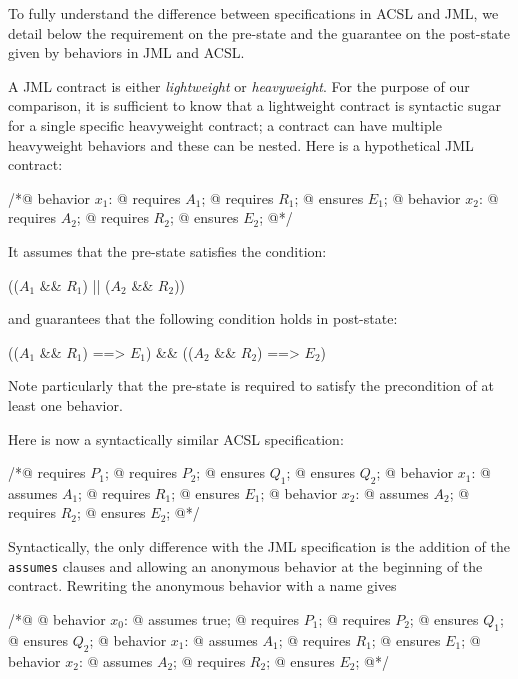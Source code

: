 To fully understand the difference between specifications in ACSL and
JML, we detail below the requirement on the pre-state and
the guarantee on the post-state given by behaviors in JML and ACSL.

A JML contract is either \emph{lightweight} or \emph{heavyweight}.
For the purpose of our comparison, it is sufficient to know that a
lightweight contract is syntactic sugar for a single specific 
heavyweight contract; a contract can have multiple heavyweight behaviors and these can be nested.
Here is a hypothetical JML contract:
\begin{listing}{1}
/*@ behavior $x_1$:
  @   requires $A_1$;
  @   requires $R_1$;
  @   ensures $E_1$;
  @ behavior $x_2$:
  @   requires $A_2$;
  @   requires $R_2$;
  @   ensures $E_2$;
  @*/
\end{listing}
It assumes that the pre-state satisfies the condition:
\begin{listing-nonumber}
(($A_1$ && $R_1$) || ($A_2$ && $R_2$))
\end{listing-nonumber}
and guarantees that the following condition holds in post-state:
\begin{listing-nonumber}
  (\old($A_1$ && $R_1$) ==> $E_1$) && (\old($A_2$ && $R_2$) ==> $E_2$)
\end{listing-nonumber}
Note particularly that the pre-state is required to satisfy
the precondition of at least one behavior.

Here is now a syntactically similar ACSL specification:

\begin{listing}{1}
/*@ requires $P_1$;
  @ requires $P_2$;
  @ ensures  $Q_1$;
  @ ensures  $Q_2$;
  @ behavior $x_1$:
  @   assumes $A_1$;
  @   requires $R_1$;
  @   ensures $E_1$;
  @ behavior $x_2$:
  @   assumes $A_2$;
  @   requires $R_2$;
  @   ensures $E_2$;
  @*/
\end{listing}

\noindent
Syntactically, the only difference with the JML specification is the
addition of the \lstinline|assumes| clauses and allowing an 
anonymous behavior at the beginning of the contract. Rewriting the anonymous behavior with a name gives

\begin{listing}{1}
	/*@ 
	@ behavior $x_0$:
	@   assumes true;
	@   requires $P_1$;
	@   requires $P_2$;
	@   ensures  $Q_1$;
	@   ensures  $Q_2$;
	@ behavior $x_1$:
	@   assumes $A_1$;
	@   requires $R_1$;
	@   ensures $E_1$;
	@ behavior $x_2$:
	@   assumes $A_2$;
	@   requires $R_2$;
	@   ensures $E_2$;
	@*/
\end{listing}

